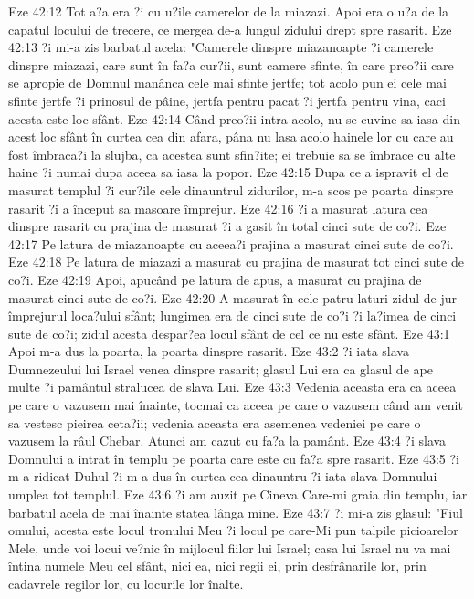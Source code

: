Eze 42:12  Tot a?a era ?i cu u?ile camerelor de la miazazi. Apoi era o u?a de la capatul locului de trecere, ce mergea de-a lungul zidului drept spre rasarit.
Eze 42:13  ?i mi-a zis barbatul acela: "Camerele dinspre miazanoapte ?i camerele dinspre miazazi, care sunt în fa?a cur?ii, sunt camere sfinte, în care preo?ii care se apropie de Domnul manânca cele mai sfinte jertfe; tot acolo pun ei cele mai sfinte jertfe ?i prinosul de pâine, jertfa pentru pacat ?i jertfa pentru vina, caci acesta este loc sfânt.
Eze 42:14  Când preo?ii intra acolo, nu se cuvine sa iasa din acest loc sfânt în curtea cea din afara, pâna nu lasa acolo hainele lor cu care au fost îmbraca?i la slujba, ca acestea sunt sfin?ite; ei trebuie sa se îmbrace cu alte haine ?i numai dupa aceea sa iasa la popor.
Eze 42:15  Dupa ce a ispravit el de masurat templul ?i cur?ile cele dinauntrul zidurilor, m-a scos pe poarta dinspre rasarit ?i a început sa masoare împrejur.
Eze 42:16  ?i a masurat latura cea dinspre rasarit cu prajina de masurat ?i a gasit în total cinci sute de co?i.
Eze 42:17  Pe latura de miazanoapte cu aceea?i prajina a masurat cinci sute de co?i.
Eze 42:18  Pe latura de miazazi a masurat cu prajina de masurat tot cinci sute de co?i.
Eze 42:19  Apoi, apucând pe latura de apus, a masurat cu prajina de masurat cinci sute de co?i.
Eze 42:20  A masurat în cele patru laturi zidul de jur împrejurul loca?ului sfânt; lungimea era de cinci sute de co?i ?i la?imea de cinci sute de co?i; zidul acesta despar?ea locul sfânt de cel ce nu este sfânt.
Eze 43:1  Apoi m-a dus la poarta, la poarta dinspre rasarit.
Eze 43:2  ?i iata slava Dumnezeului lui Israel venea dinspre rasarit; glasul Lui era ca glasul de ape multe ?i pamântul stralucea de slava Lui.
Eze 43:3  Vedenia aceasta era ca aceea pe care o vazusem mai înainte, tocmai ca aceea pe care o vazusem când am venit sa vestesc pieirea ceta?ii; vedenia aceasta era asemenea vedeniei pe care o vazusem la râul Chebar. Atunci am cazut cu fa?a la pamânt.
Eze 43:4  ?i slava Domnului a intrat în templu pe poarta care este cu fa?a spre rasarit.
Eze 43:5  ?i m-a ridicat Duhul ?i m-a dus în curtea cea dinauntru ?i iata slava Domnului umplea tot templul.
Eze 43:6  ?i am auzit pe Cineva Care-mi graia din templu, iar barbatul acela de mai înainte statea lânga mine.
Eze 43:7  ?i mi-a zis glasul: "Fiul omului, acesta este locul tronului Meu ?i locul pe care-Mi pun talpile picioarelor Mele, unde voi locui ve?nic în mijlocul fiilor lui Israel; casa lui Israel nu va mai întina numele Meu cel sfânt, nici ea, nici regii ei, prin desfrânarile lor, prin cadavrele regilor lor, cu locurile lor înalte.
